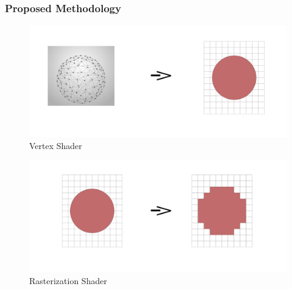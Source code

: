 \documentclass{beamer}
\begin{document}
	\begin{frame}
		\frametitle{Proposed Methodology}
		\begin{center}
			\begin{figure}
				\includegraphics[height=0.3\textheight]{imgs/vertex.jpg}
				\caption{Vertex Shader}
			\end{figure}
			\begin{figure}
				\includegraphics[height=0.3\textheight]{imgs/rasterization.jpg}
				\caption{Rasterization Shader}
			\end{figure}
		\end{center}
	\end{frame}
\end{document}
